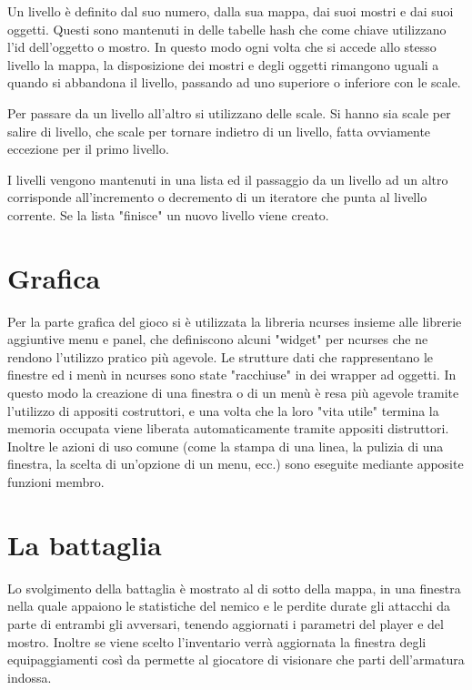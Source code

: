 \documentclass[10pt]{report}
\begin{document}
Un livello è definito dal suo numero, dalla sua mappa, dai suoi mostri e dai suoi oggetti. Questi sono mantenuti in
delle tabelle hash che come chiave utilizzano l'id dell'oggetto o mostro. In questo modo ogni volta che si accede allo
stesso livello la mappa, la disposizione dei mostri e degli oggetti rimangono uguali a quando si abbandona il livello,
passando ad uno superiore o inferiore con le scale.

Per passare da un livello all'altro si utilizzano delle scale. Si hanno sia scale per salire di livello, che scale per
tornare indietro di un livello, fatta ovviamente eccezione per il primo livello.

I livelli vengono mantenuti in una lista ed il passaggio da un livello ad un altro corrisponde all'incremento o
decremento di un iteratore che punta al livello corrente. Se la lista "finisce" un nuovo livello viene creato.

\section{Grafica}

Per la parte grafica del gioco si è utilizzata la libreria ncurses insieme alle librerie aggiuntive menu e
panel, che definiscono alcuni "widget" per ncurses che ne rendono l'utilizzo pratico più agevole. Le strutture dati che
rappresentano le finestre ed i menù in ncurses sono state "racchiuse" in dei wrapper ad oggetti. In questo modo la
creazione di una finestra o di un menù è resa più agevole tramite l'utilizzo di appositi costruttori, e una volta che
la loro "vita utile" termina la memoria occupata viene liberata automaticamente tramite appositi distruttori. Inoltre le
azioni di uso comune (come la stampa di una linea, la pulizia di una finestra, la scelta di un'opzione di un menu,
ecc.) sono eseguite mediante apposite funzioni membro.

\section{La battaglia}

Lo svolgimento della battaglia è mostrato al di sotto della mappa, in una finestra nella quale appaiono le statistiche del nemico e le perdite durate gli attacchi da parte di entrambi gli avversari, tenendo aggiornati i parametri del player e del mostro. Inoltre se viene scelto l'inventario verrà aggiornata la finestra degli equipaggiamenti così da permette al giocatore di visionare che parti dell'armatura indossa.
\end{document}
